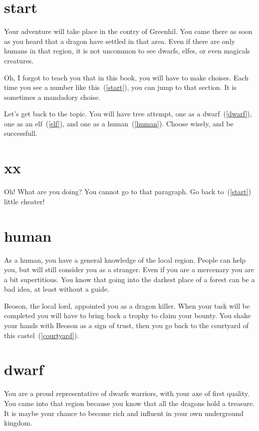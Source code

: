 \section{start}

Your adventure will take place in the contry of Greenhil. You came there as soon
as you heard that a dragon have settled in that area. Even if there are only
humans in that region, it is not uncommon to see dwarfs, elfes, or even magicals
creatures.

Oh, I forgot to teach you that in this book, you will have to make choises. Each
time you see a number like this~(\ref{start}), you can jump to that section.
It is sometimes a mandadory choise.

Let's get back to the topic. You will have tree attempt, one as a
dwarf~(\ref{dwarf}), one as an elf~(\ref{elf}), and one as a
human~(\ref{human}). Choose wisely, and be successfull.

\section{xx}

Oh! What are you doing? You cannot go to that paragraph. Go back
to~(\ref{start}) little cheater!

\section{human}

As a human, you have a general knowledge of the local region. People can help
you, but will still consider you as a stranger. Even if you are a mercenary you
are a bit supertitious. You know that going into the darkest place of a forest
can be a bad idea, at least without a guide.

Beoson, the local lord, appointed you as a dragon killer. When your task will be
completed you will have to bring back a trophy to claim your bounty. You shake
your hands with Beoson as a sign of trust, then you go back to the courtyard of
this castel~(\ref{courtyard}).

\section{dwarf}

You are a proud representative of dwarfs warriors, with your axe of first
quality. You came into that region because you know that all the dragons hold a
treasure. It is maybe your chance to become rich and influent in your own
underground kingdom.

